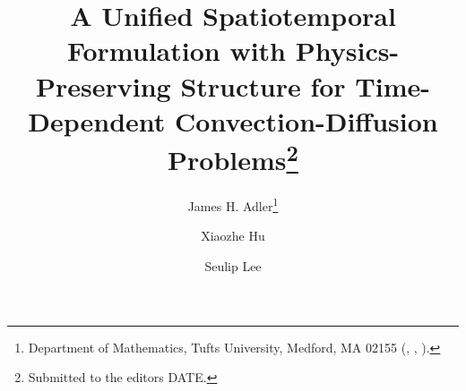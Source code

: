 

\usepackage{lipsum}
\usepackage{amsfonts}
\usepackage{amsmath}
\usepackage{graphicx}
\usepackage{epstopdf}
\usepackage{algorithmic}
\usepackage{bm}
\usepackage{tikz}
\ifpdf
\else
\fi

\newcommand{\creflastconjunction}{, and~}


\newcommand{\bu}{{\bf u}}
\newcommand{\dx}{{\rm d}x}
\newcommand{\dy}{{\rm d}y}
\newcommand{\dz}{{\rm d}z}
\newcommand{\dt}{{\rm d}t}
\newcommand{\dzero}{{\rm d}_0}
\newcommand{\done}{{\rm d}_1}
\newcommand{\dtwo}{{\rm d}_2}
\newcommand{\dthree}{{\rm d}_3}
\newcommand{\dfour}{{\rm d}_4}
\newcommand{\trinorm}[1]{{\vert\kern-0.25ex\vert\kern-0.25ex\vert #1 \vert\kern-0.25ex\vert\kern-0.25ex\vert}}


\title{A Unified Spatiotemporal Formulation with Physics-Preserving Structure for Time-Dependent Convection-Diffusion Problems\thanks{Submitted to the editors DATE.
}}

\author{James H. Adler\thanks{Department of Mathematics, Tufts University, Medford, MA 02155  (, , ).}
\and Xiaozhe Hu\footnotemark[2]
\and Seulip Lee\footnotemark[2]}

\usepackage{amsopn}
\DeclareMathOperator{\diag}{diag}


